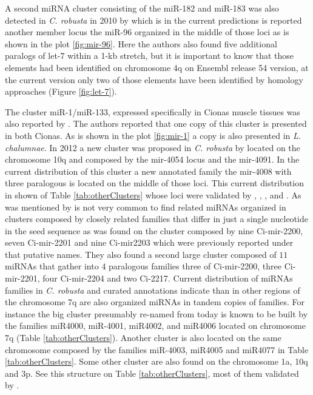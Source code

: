 \documentclass[graybox]{svmult}
\begin{document}
A second miRNA cluster consisting of the miR-182 and miR-183 was also detected 
in \textit{C. robusta} in 2010 by \cite{Keshavan2010} which is in the 
current predictions is reported another member locus the miR-96 organized in 
the middle of those loci as is shown in the plot \ref{fig:mir-96}. 
Here the authors also found five additional paralogs of let-7 within a 1-kb 
stretch, but it is important to know that those elements had been identified on 
chromosome 4q on Ensembl release 54 version, at the current version only 
two of those elements have been identified by homology approaches (Figure 
\ref{fig:let-7}).

The cluster miR-1/miR-133, expressed specifically in Cionas muscle tissues was 
also reported by \cite{Kusakabe2013}. The authors reported that one copy of 
this cluster is presented in both Cionas. As is shown in the plot 
\ref{fig:mir-1} a copy is also presented in \textit{L. chalumnae}. In 2012 a 
new cluster was proposed in \textit{C. robusta} by \cite{Terai2012} located 
on the chromosome 10q and composed by the mir-4054 locus and the mir-4091. In 
the current distribution of this cluster a new annotated family the mir-4008 
with three paralogous is located on the middle of those loci. This current 
distribution in shown of Table \ref{tab:otherClusters} whose loci were  
validated by \cite{Norden-Krichmar2007}, \cite{Fu:08}, \cite{Hendrix2010}, and 
\cite{Terai2012}. As was mentioned by \cite{Hendrix2010} is not very common to 
find related miRNAs organized in clusters composed by closely related families 
that differ in just a single nucleotide in the seed sequence as was found on 
the cluster composed by nine Ci-mir-2200, seven Ci-mir-2201 and nine Ci-mir2203 
which were previously reported under that putative names. They also found a 
second large cluster composed of $11$ miRNAs that gather into $4$ paralogous 
families three of Ci-mir-2200, three Ci-mir-2201, four Ci-mir-2204 and two 
Ci-2217. Current distribution of miRNAs families in \textit{C. robusta} and 
curated annotations indicate than in other regions of the chromosome 7q are 
also organized miRNAs in tandem copies of families. For instance the big 
cluster presumably re-named from \cite{Hendrix2010} today is known to be built 
by the families miR4000, miR-4001, miR4002, and miR4006 located on chromosome 
7q (Table \ref{tab:otherClusters}). Another cluster is also located on the same 
chromosome composed by the families miR-4003, miR4005 and miR4077 in Table 
\ref{tab:otherClusters}. Some other cluster are also found on the chromosome 1a, 
10q and 3p. See this structure on Table \ref{tab:otherClusters}, most 
of them validated by \cite{Hendrix2010}. 
\end{document}
